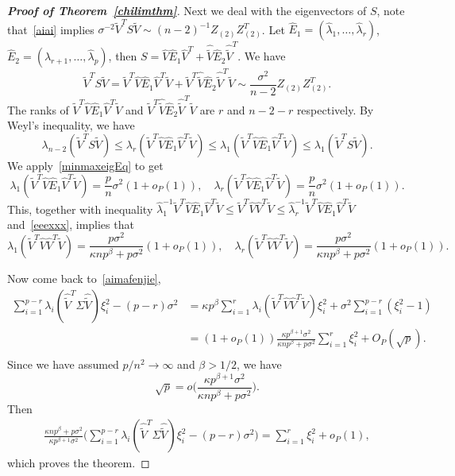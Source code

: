 \documentclass[review]{elsarticle}
\theoremstyle{plain}
\theoremstyle{definition}
\theoremstyle{remark}
\begin{document}
\begin{proof}[\textbf{Proof of Theorem~\ref{chilimthm}}]
    Next we deal with the eigenvectors of $S$, note that~\eqref{aiai} implies
    $
    \sigma^{-2}\tilde{V}^T S \tilde{V} \sim {(n-2)}^{-1} Z_{(2)} Z_{(2)}^T
    $. Let $\hat{E}_1=(\hat{\lambda}_1,\ldots,\hat{\lambda}_r)$, $\hat{E}_2=(\hat{\lambda}_{r+1},\ldots,\hat{\lambda}_{p})$, then $S=\hat{V}\hat{E}_1\hat{V}^T+\hat{\tilde{V}}\hat{E}_2\hat{\tilde{V}}^T$.
    We have
$$
    \tilde{V}^T S \tilde{V}=
    \tilde{V}^T \hat{V}\hat{E}_1\hat{V}^T\tilde{V}+
    \tilde{V}^T\hat{\tilde{V}}\hat{E}_2\hat{\tilde{V}}^T \tilde{V} \sim
    \frac{\sigma^2}{n-2} Z_{(2)} Z_{(2)}^T.
$$
The ranks of $\tilde{V}^T \hat{V}\hat{E}_1\hat{V}^T\tilde{V}$ and $\tilde{V}^T\hat{\tilde{V}}\hat{E}_2\hat{\tilde{V}}^T \tilde{V}$ are $r$ and $n-2-r$ respectively. 
By Weyl's inequality, we have
$$
\lambda_{n-2}(\tilde{V}^T S \tilde{V})
\leq
\lambda_r(\tilde{V}^T \hat{V}\hat{E}_1\hat{V}^T\tilde{V})
\leq
\lambda_1(\tilde{V}^T \hat{V}\hat{E}_1\hat{V}^T\tilde{V})
\leq \lambda_1(\tilde{V}^T S\tilde{V}).
$$
We apply~\eqref{minmaxeigEq} to get
$$
\lambda_1(\tilde{V}^T \hat{V}\hat{E}_1\hat{V}^T\tilde{V})=\frac{p}{n}\sigma^2(1+o_P(1)),\quad
\lambda_r(\tilde{V}^T \hat{V}\hat{E}_1\hat{V}^T\tilde{V})=\frac{p}{n}\sigma^2(1+o_P(1)).
$$
This, together with inequality $
\hat{\lambda}_1^{-1}\tilde{V}^T \hat{V}\hat{E}_1\hat{V}^T\tilde{V}
\leq
\tilde{V}^T \hat{V}\hat{V}^T\tilde{V}
\leq
\hat{\lambda}_r^{-1}
\tilde{V}^T \hat{V}\hat{E}_1\hat{V}^T\tilde{V}$ and~\eqref{eeexxx}, implies that
$$
\lambda_1(\tilde{V}^T \hat{V}\hat{V}^T\tilde{V})=\frac{p\sigma^2}{\kappa n p^{\beta}+p\sigma^2}(1+o_P(1))
,\quad
\lambda_r(\tilde{V}^T \hat{V}\hat{V}^T\tilde{V})=\frac{p\sigma^2}{\kappa n p^{\beta}+p\sigma^2}(1+o_P(1)).
$$

Now come back to~\eqref{aimafenjie},
\begin{equation*}
    \begin{aligned}
    \sum_{i=1}^{p-r} \lambda_i(\hat{\tilde{V}}^T\Sigma\hat{\tilde{V}})\xi_i^2
        -(p-r)\sigma^2
        &=
    \kappa p^{\beta}\sum_{i=1}^r \lambda_i(\tilde{V}^T\hat{V}\hat{V}^T\tilde{V})\xi_i^2+
        \sigma^2\sum_{i=1}^{p-r}(\xi_i^2-1)\\
        &=
        (1+o_P(1))
        \frac{\kappa p^{\beta+1}\sigma^2}{\kappa n p^{\beta}+p\sigma^2}\sum_{i=1}^r \xi_i^2
        +
        O_P(\sqrt{p}).\\
    \end{aligned}
\end{equation*}
Since we have assumed $p/n^2\to \infty$ and $\beta>1/2$, we have
$$
\sqrt{p}=o\big(\frac{\kappa p^{\beta+1}\sigma^2}{\kappa n p^{\beta}+p\sigma^2}\big).
$$
Then
\begin{equation*}
    \begin{aligned}
        \frac{\kappa n p^{\beta}+p\sigma^2}{\kappa p^{\beta+1}\sigma^2}
        \Big(\sum_{i=1}^{p-r} \lambda_i(\hat{\tilde{V}}^T\Sigma\hat{\tilde{V}})\xi_i^2
        -(p-r)\sigma^2\Big)=\sum_{i=1}^r \xi_i^2+o_P(1),
    \end{aligned}
\end{equation*}
which proves the theorem.

\end{proof}
\end{document}

